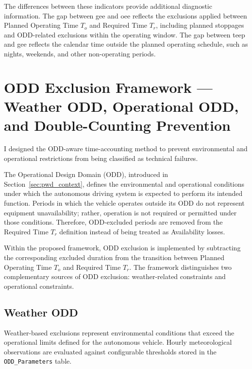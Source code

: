 The differences between these indicators provide additional diagnostic information. The gap between \acrshort{gee} and \acrshort{oee} reflects the exclusions applied between Planned Operating Time $T_o$ and Required Time $T_r$, including planned stoppages and ODD-related exclusions within the operating window. The gap between \acrshort{teep} and \acrshort{gee} reflects the calendar time outside the planned operating schedule, such as nights, weekends, and other non-operating periods.


\section{ODD Exclusion Framework --- Weather ODD, Operational ODD, and Double-Counting Prevention}
\label{sec:odd-exclusion-framework}

I designed the ODD-aware time-accounting method to prevent environmental and operational restrictions from being classified as technical failures.

The Operational Design Domain (ODD), introduced in Section~\ref{sec:pwd_context}, defines the environmental and operational conditions under which the autonomous driving system is expected to perform its intended function. Periods in which the vehicle operates outside its ODD do not represent equipment unavailability; rather, operation is not required or permitted under those conditions. Therefore, ODD-excluded periods are removed from the Required Time $T_r$ definition instead of being treated as Availability losses.

Within the proposed framework, ODD exclusion is implemented by subtracting the corresponding excluded duration from the transition between Planned Operating Time $T_o$ and Required Time $T_r$. The framework distinguishes two complementary sources of ODD exclusion: weather-related constraints and operational constraints.

\subsection{Weather ODD}

Weather-based exclusions represent environmental conditions that exceed the operational limits defined for the autonomous vehicle. Hourly meteorological observations are evaluated against configurable thresholds stored in the \texttt{ODD\_Parameters} table.

